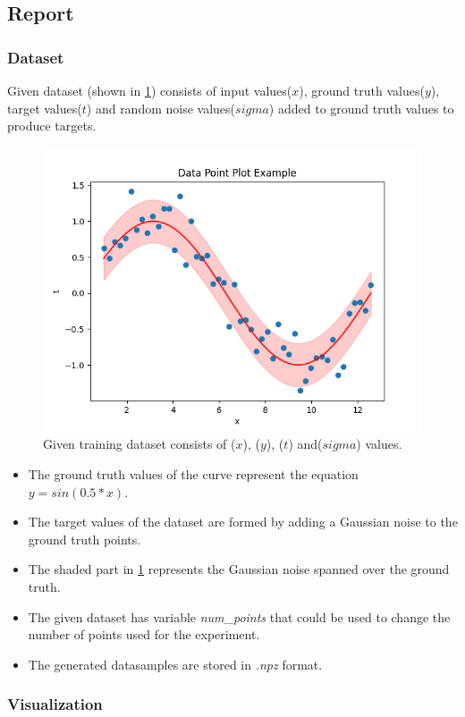 \documentclass[12pt,twoside,a4paper]{article}
\begin{document}
\subsection{Report}
\subsubsection{Dataset}
Given dataset (shown in \ref{fig: DATASET}) consists of input values($x$), ground truth values($y$), target values($t$) and random noise values($sigma$) added to ground truth values to produce targets.
\begin{figure}[H]
    \centering
    \includegraphics[width=0.5\linewidth]{results/gt_data.png}
    \caption{Given training dataset consists of ($x$), ($y$), ($t$) and($sigma$) values.}
    \label{fig: DATASET}
\end{figure}
\begin{itemize}
    \item The ground truth values of the curve represent the equation $y = sin(0.5*x)$.
    \item The target values of the dataset are formed by adding a Gaussian noise to the ground truth points.
    \item The shaded part in \ref{fig: DATASET} represents the Gaussian noise spanned over the ground truth.
    \item The given dataset has variable \textit{num\_points} that could be used to change the number of points used for the experiment.
    \item The generated datasamples are stored in \textit{.npz} format.
\end{itemize}
\subsubsection{Visualization}
\end{document}
